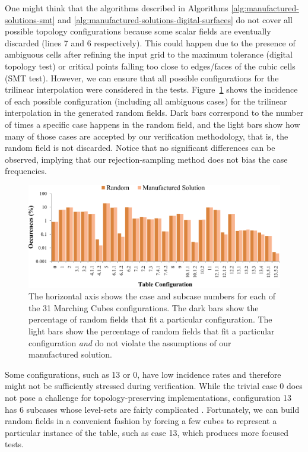 One might think that the algorithms described in Algorithms
\ref{alg:manufactured-solutions-smt} and
\ref{alg:manufactured-solutions-digital-surfaces} do not cover all
possible topology configurations because 
some scalar fields are eventually discarded (lines 7 and 6
respectively). This could happen due to the presence of ambiguous cells after
refining the input grid to the maximum tolerance (digital topology test) or 
critical points falling too close to edges/faces of the cubic cells (SMT
test). However, we can ensure that all  
possible configurations for the trilinear interpolation were considered in the tests. 
Figure~\ref{fig:cubes-entries} shows the incidence of each possible
configuration (including all ambiguous cases)  
for the trilinear interpolation in the generated random fields. Dark bars correspond to the
number of times a specific case happens in the random field, and the
light bars show
how many of those cases are accepted by our verification methodology,
that is, the random field is 
not discarded. 
Notice that no significant differences can be observed, implying that
our rejection-sampling method does not bias the case frequencies.

\begin{figure}[b]
\centering
\includegraphics[width=0.9\linewidth,keepaspectratio=true]
{chapter3/figures/random-sampling.pdf}
\caption{The horizontal axis shows the case and subcase numbers for
  each of the 31 Marching Cubes configurations. 
  The dark bars show the percentage of
  random fields that fit a particular configuration. The light bars
  show the percentage of random fields that fit a particular
  configuration \emph{and} do not violate the assumptions of our
  manufactured solution. }
\label{fig:cubes-entries}
\end{figure}

Some configurations, such as 13 or
0, have low incidence rates and therefore might not be sufficiently stressed during verification. While the
trivial case 0 does not pose a challenge for
topology-preserving implementations, configuration 13 has 6 subcases
whose level-sets are fairly complicated \cite{lopes:tvcg:2003,
Nielson03onmarching}. Fortunately, we can build random fields in a convenient
fashion by forcing a few cubes to represent a
particular instance of the table, such as case 13, which produces 
more focused tests.



